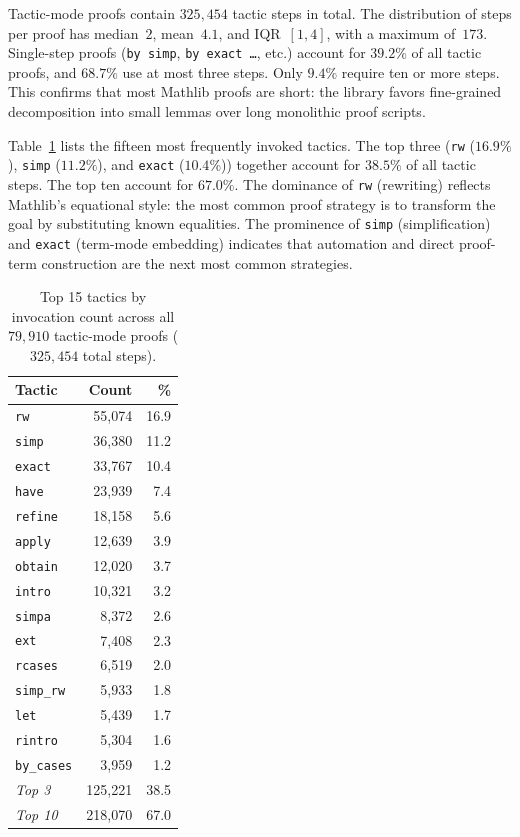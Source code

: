 Tactic-mode proofs contain $325{,}454$ tactic steps in total. The distribution of steps per proof has median~$2$, mean~$4.1$, and IQR~$[1, 4]$, with a maximum of~$173$. Single-step proofs (\texttt{by simp}, \texttt{by exact \ldots}, etc.) account for $39.2\%$ of all tactic proofs, and $68.7\%$ use at most three steps. Only $9.4\%$ require ten or more steps. This confirms that most Mathlib proofs are short: the library favors fine-grained decomposition into small lemmas over long monolithic proof scripts.

Table~\ref{tab:tactic-freq} lists the fifteen most frequently invoked tactics. The top three (\texttt{rw} ($16.9\%$), \texttt{simp} ($11.2\%$), and \texttt{exact} ($10.4\%$)) together account for $38.5\%$ of all tactic steps. The top ten account for $67.0\%$. The dominance of \texttt{rw} (rewriting) reflects Mathlib's equational style: the most common proof strategy is to transform the goal by substituting known equalities. The prominence of \texttt{simp} (simplification) and \texttt{exact} (term-mode embedding) indicates that automation and direct proof-term construction are the next most common strategies.

\begin{table}[ht]
\centering
\small
\caption{Top 15 tactics by invocation count across all $79{,}910$ tactic-mode proofs ($325{,}454$ total steps).}
\label{tab:tactic-freq}
\begin{tabular}{l r r}
\toprule
\textbf{Tactic} & \textbf{Count} & \textbf{\%} \\
\midrule
\texttt{rw}       & 55,074 & 16.9 \\
\texttt{simp}     & 36,380 & 11.2 \\
\texttt{exact}    & 33,767 & 10.4 \\
\texttt{have}     & 23,939 &  7.4 \\
\texttt{refine}   & 18,158 &  5.6 \\
\texttt{apply}    & 12,639 &  3.9 \\
\texttt{obtain}   & 12,020 &  3.7 \\
\texttt{intro}    & 10,321 &  3.2 \\
\texttt{simpa}    &  8,372 &  2.6 \\
\texttt{ext}      &  7,408 &  2.3 \\
\texttt{rcases}   &  6,519 &  2.0 \\
\texttt{simp\_rw} &  5,933 &  1.8 \\
\texttt{let}      &  5,439 &  1.7 \\
\texttt{rintro}   &  5,304 &  1.6 \\
\texttt{by\_cases} & 3,959 &  1.2 \\
\midrule
\emph{Top 3}      & 125,221 & 38.5 \\
\emph{Top 10}     & 218,070 & 67.0 \\
\bottomrule
\end{tabular}
\end{table}

